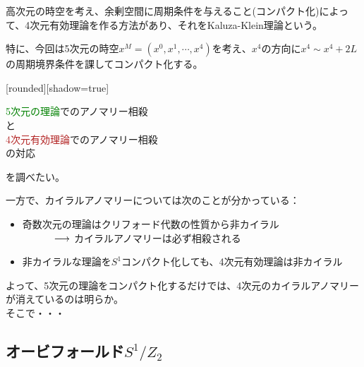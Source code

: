 \documentclass[
  unicode,a4paper,10pt,
  xcolor = {dvipsnames,svgnames},
  hyperref ={colorlinks=true,citecolor=Navy,linkcolor=NavyBlue,urlcolor=purple},
  ja=standard,lualatex
]{beamer}
\begin{document}
\begin{frame}{\subsecname}

  高次元の時空を考え、余剰空間に周期条件を与えること(コンパクト化)によって、4次元有効理論を作る方法があり、それをKaluza-Klein理論という。

  \vspace*{5pt}

  特に、今回は5次元の時空$x^{M}=(x^{0},x^{1},\cdots,x^{4})$を考え、$x^{4}$の方向に$x^{4}\sim x^{4}+2L$の周期境界条件を課してコンパクト化する。

  \pause
  \vspace*{10pt}

  [rounded][shadow=true]
  \begin{block}{}
    \centering
    \textcolor{Green}{5次元の理論}でのアノマリー相殺
    \\
    と
    \\
    \textcolor{FireBrick}{4次元有効理論}でのアノマリー相殺
    \\
    の対応
  \end{block}
  を調べたい。

\end{frame}


\begin{frame}

  一方で、カイラルアノマリーについては次のことが分かっている：

  \begin{itemize}
    \item 
    奇数次元の理論はクリフォード代数の性質から非カイラル\\
    $\hspace*{1cm}\ \longrightarrow\ $カイラルアノマリーは必ず相殺される
    \item 
    非カイラルな理論を$S^{1}$コンパクト化しても、4次元有効理論は非カイラル
  \end{itemize}

  \pause

  よって、5次元の理論をコンパクト化するだけでは、4次元のカイラルアノマリーが消えているのは明らか。\\

  そこで・・・  

\end{frame}

\subsection{オービフォールド\texorpdfstring{$S^{1}/Z_{2}$}{S1/Z2}}
\end{document}
